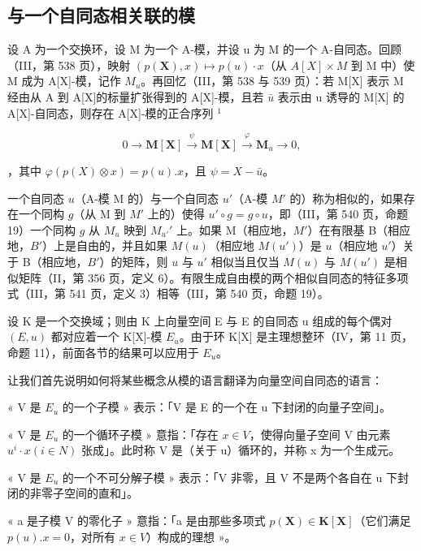 \subsection{与一个自同态相关联的模}

设 A 为一个交换环，设 M 为一个 A-模，并设 u 为 M 的一个 A-自同态。回顾（III，第 538 页），映射 \((p(\mathbf{X}), x) \mapsto p(u) \cdot x\)（从 \(A[X] \times M\) 到 M 中）使 M 成为 A{[}X{]}-模，记作 \(M_{u}\)。再回忆（III，第 538 与 539 页）：若 M{[}X{]} 表示 M 经由从 A 到 A{[}X{]}的标量扩张得到的 A{[}X{]}-模，且若 \(\bar{u}\) 表示由 u 诱导的 M{[}X{]} 的 A{[}X{]}-自同态，则存在 A{[}X{]}-模的正合序列 \(^{1}\)

\[
0 \to \mathbf {M} [ \mathbf {X} ] \stackrel {\psi} {\to} \mathbf {M} [ \mathbf {X} ] \stackrel {\varphi} {\to} \mathbf {M} _ {u} \to 0,\tag{1}
\]

，其中 \(\varphi(p(X) \otimes x) = p(u).x\)，且 \(\psi = X - \bar{u}\)。

一个自同态 \(u\)（A-模 M 的）与一个自同态 \(u'\)（A-模 \(M'\) 的）称为相似的，如果存在一个同构 \(g\)（从 M 到 \(M'\) 上的）使得 \(u' \circ g = g \circ u\)，即（III，第 540 页，命题 19）一个同构 \(g\) 从 \(M_u\) 映到 \(M_{u'}'\) 上。如果 M（相应地，\(M'\)）在有限基 B（相应地，\(B'\)）上是自由的，并且如果 \(M(u)\)（相应地 \(M(u')\)）是 \(u\)（相应地 \(u'\)）关于 B（相应地，\(B'\)）的矩阵，则 \(u\) 与 \(u'\) 相似当且仅当 \(M(u)\) 与 \(M(u')\) 是相似矩阵（II，第 356 页，定义 6）。有限生成自由模的两个相似自同态的特征多项式（III，第 541 页，定义 3）相等（III，第 540 页，命题 19）。

设 K 是一个交换域；则由 K 上向量空间 E 与 E 的自同态 u 组成的每个偶对 \((E, u)\) 都对应着一个 K{[}X{]}-模 \(E_{u}\)。由于环 K{[}X{]} 是主理想整环（IV，第 11 页，命题 11），前面各节的结果可以应用于 \(E_{u}\)。

让我们首先说明如何将某些概念从模的语言翻译为向量空间自同态的语言：

« V 是 \(E_{u}\) 的一个子模 » 表示：「V 是 E 的一个在 u 下封闭的向量子空间」。

« V 是 \(E_{u}\) 的一个循环子模 » 意指：「存在 \(x \in V\)，使得向量子空间 V 由元素 \(u^{i} \cdot x (i \in N)\) 张成」。此时称 V 是（关于 u）循环的，并称 x 为一个生成元。

« V 是 \(E_{u}\) 的一个不可分解子模 » 表示：「V 非零，且 V 不是两个各自在 u 下封闭的非零子空间的直和」。

« a 是子模 V 的零化子 » 意指：「a 是由那些多项式 \(p(\mathbf{X}) \in \mathbf{K}[\mathbf{X}]\)（它们满足 \(p(u).x = 0\)，对所有 \(x \in V\)）构成的理想 »。

